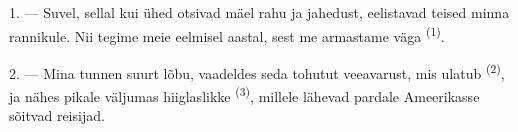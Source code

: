 %
%
%
%
%
%
%

\VUsaut{4.0mm}
\VUsaut{3.0mm}
\VUsaut{3.0mm}

1. --- Suvel, sellal kui ühed otsivad mäel rahu ja jahedust, eelistavad teised minna
rannikule. Nii tegime meie eelmisel aastal, sest me armastame väga 
\textsuperscript{(1)}.

2. --- Mina tunnen suurt lõbu, vaadeldes seda tohutut veeavarust, mis ulatub
 \textsuperscript{(2)}, ja nähes pikale 
väljumas hiiglaslikke  \textsuperscript{(3)}, millele lähevad pardale
Ameerikasse sõitvad reisijad.

